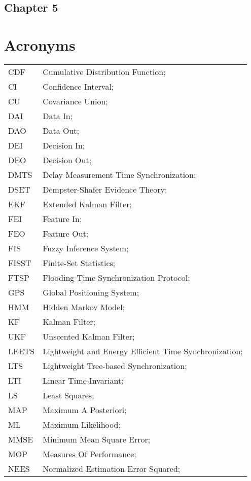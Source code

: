 \subsection*{Chapter 5}

\newpage
\section*{Acronyms}
\begin{longtable}{ll}
	CDF			& Cumulative Distribution Function; \\
	CI			& Confidence Interval; \\
	CU			& Covariance Union; \\
	DAI			& Data In; \\
	DAO			& Data Out; \\
	DEI			& Decision In; \\
	DEO 		& Decision Out; \\
	DMTS		& Delay Measurement Time Synchronization; \\
	DSET 		& Dempster-Shafer Evidence Theory; \\		
	EKF			& Extended Kalman Filter; \\
	FEI			& Feature In; \\
	FEO			& Feature Out; \\
	FIS			& Fuzzy Inference System; \\
	FISST		& Finite-Set Statistics; \\
	FTSP		& Flooding Time Synchronization Protocol; \\
	GPS			& Global Positioning System; \\
	HMM			& Hidden Markov Model; \\
	KF 			& Kalman Filter; \\
	UKF			& Unscented Kalman Filter; \\
	LEETS		& Lightweight and Energy Efficient Time Synchronization; \\
	LTS			& Lightweight Tree-based Synchronization; \\
	LTI			& Linear Time-Invariant; \\
	LS			& Least Squares; \\
	MAP			& Maximum A Posteriori; \\
	ML			& Maximum Likelihood; \\
	MMSE		& Minimum Mean Square Error; \\
	MOP 		& Measures Of Performance; \\
	NEES		& Normalized Estimation Error Squared; \\

\end{longtable}
